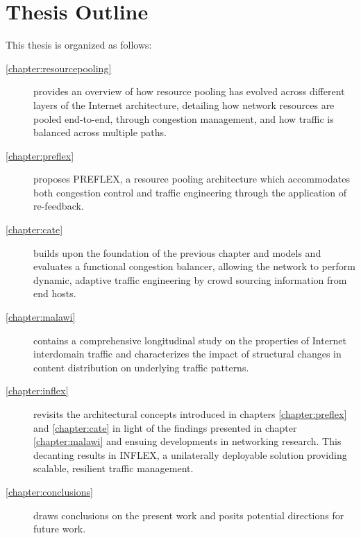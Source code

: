 \section{Thesis Outline}
\label{sec:introduction:outline}

This thesis is organized as follows:

\renewcommand{\descriptionlabel}[1]{\hspace{\labelsep}\textbf{Chapter #1}}
\begin{description}
\item[\ref{chapter:resourcepooling}] provides an overview of how resource pooling has evolved across different layers of the Internet architecture, detailing how network resources are pooled end-to-end, through congestion management, and how traffic is balanced across multiple paths.
\item[\ref{chapter:preflex}] proposes \acs{PREFLEX}, a resource pooling architecture which accommodates both congestion control and traffic engineering through the application of re-feedback. 
\item[\ref{chapter:cate}] builds upon the foundation of the previous chapter and models and evaluates a functional congestion balancer, allowing the network to perform dynamic, adaptive traffic engineering by crowd sourcing information from end hosts.
\item[\ref{chapter:malawi}] contains a comprehensive longitudinal study on the properties of Internet interdomain traffic and characterizes the impact of structural changes in content distribution on underlying traffic patterns.
\item[\ref{chapter:inflex}] revisits the architectural concepts introduced in chapters \ref{chapter:preflex} and \ref{chapter:cate} in light of the findings presented in chapter \ref{chapter:malawi} and ensuing developments in networking research. This decanting results in INFLEX, a unilaterally deployable solution providing scalable, resilient traffic management.
\item[\ref{chapter:conclusions}] draws conclusions on the present work and posits potential directions for future work.
\end{description}

